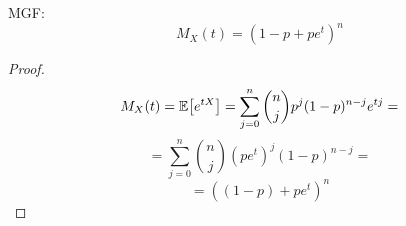 \begin{theorem}
    MGF:
    \[ M_X(t) = (1 - p + pe^t)^n\]
\end{theorem}

\begin{proof}
    \[
    M_X(t) = \expected{e^{tX}} = \sum_{j=0}^n \binom{n}{j}p^j(1-p)^{n-j}e^{tj} =
    \]
    \[
    =  \sum_{j=0}^n \binom{n}{j}(pe^t)^j(1-p)^{n-j} =
    \]
    \[
    = ((1-p) + pe^t)^n
    \]
\end{proof}